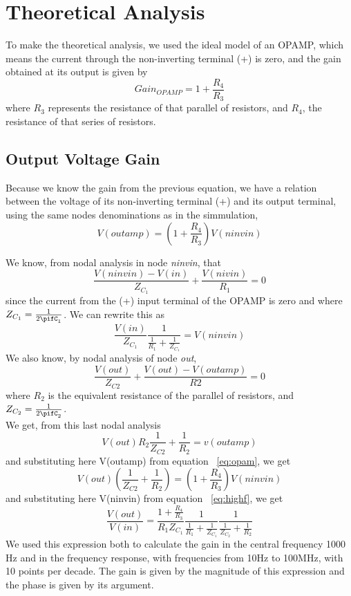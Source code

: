 \section{Theoretical Analysis}
To make the theoretical analysis, we used the ideal model of an OPAMP, which means the current through the non-inverting terminal (+) is zero, and the gain obtained at its output is given by
\begin{equation}
Gain_{OPAMP}=1+\frac{R_4}{R_3}  
\end{equation}
where $R_3$ represents the resistance of that parallel of resistors, and $R_4$, the resistance of that series of resistors.
\subsection{Output Voltage Gain}
Because we know the gain from the previous equation, we have a relation between the voltage of its non-inverting terminal (+) and its output terminal, using the same nodes denominations as in the simmulation,
\begin{equation}\label{eq:opam}
  V(outamp)=(1+\frac{R_4}{R_3})V(ninvin)
\end{equation}

We know, from nodal analysis in node \textit{ninvin}, that
\begin{equation}
  \frac{V(ninvin)-V(in)}{Z_{C_1}}+\frac{V(nivin)}{R_1}=0
\end{equation}
since the current from the (+) input terminal of the OPAMP is zero and where  $Z_{C_1}=\frac{1}{2\pifC_1}$. We can rewrite this as
\begin{equation}\label{eq:highf}
  \frac{V(in)}{Z_{C_1}}\frac{1}{\frac{1}{R_1}+\frac{1}{Z_{C_1}}}=V(ninvin)
\end{equation}
We also know, by nodal analysis of node \textit{out},
\begin{equation}
  \frac{V(out)}{Z_{C2}}+\frac{V(out)-V(outamp)}{R2}=0
\end{equation}
where $R_2$ is the equivalent resistance of the parallel of resistors, and $Z_{C_2}=\frac{1}{2\pifC_2}$.\\
We get, from this last nodal analysis
\begin{equation}
  V(out)R_2\frac{1}{Z_{C2}}+\frac{1}{R_2}=v(outamp)
\end{equation}
and substituting here V(outamp) from equation ~\ref{eq:opam}, we get
\begin{equation}
  V(out)(\frac{1}{Z_{C2}}+\frac{1}{R_2})=(1+\frac{R_4}{R_3})V(ninvin)
\end{equation}
and substituting here V(ninvin) from equation ~\ref{eq:highf}, we get
\begin{equation}
  \frac{V(out)}{V(in)}=\frac{1+\frac{R_4}{R_3}}{R_1 Z_{C_1}}\frac{1}{\frac{1}{R_1}+\frac{1}{Z_{C_1}}}\frac{1}{\frac{1}{Z_{C_2}}+\frac{1}{R_2}}
\end{equation}
We used this expression both to calculate the gain in the central frequency 1000 Hz and in the frequency response, with frequencies from 10Hz to 100MHz, with 10 points per decade. The gain is given by the magnitude of this expression and the phase is given by its argument.

